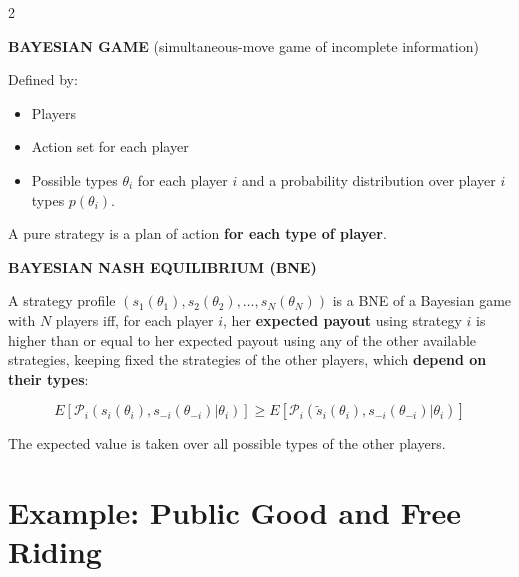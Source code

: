 \documentclass[a4paper,9pt]{extarticle}
\begin{document}
\begin{multicols}{2}
\begin{definition}

\textbf{BAYESIAN GAME} (simultaneous-move game of incomplete information)

Defined by:

\begin{itemize}

\item Players

\item Action set for each player

\item Possible types $\theta_i$ for each player $i$ and a probability distribution over
player $i$ types $p(\theta_i)$.

\end{itemize}

A pure strategy is a plan of action \textbf{for each type of player}.

\end{definition}


\begin{definition}

\textbf{BAYESIAN NASH EQUILIBRIUM (BNE)}

A strategy profile $(s_1(\theta_1), s_2(\theta_2), \dots, s_N(\theta_N))$ is a BNE of a
Bayesian game with $N$ players iff, for each player $i$, her \textbf{expected payout} using
strategy $i$ is higher than or equal to her expected payout using any of the other available
strategies, keeping fixed the strategies of the other players, which \textbf{depend on their
types}:

\[
E[\mathcal{P}_i(s_i(\theta_i), s_{-i}(\theta_{-i}) | \theta_i)] \ge
E[\mathcal{P}_i(\tilde{s}_i(\theta_i), s_{-i}(\theta_{-i}) | \theta_i)]
\]

The expected value is taken over all possible types of the other players.

\end{definition}



\section{Example: Public Good and Free Riding}


\begin{example}

\begin{itemize}


\end{itemize}
\end{example}
\end{multicols}
\end{document}
